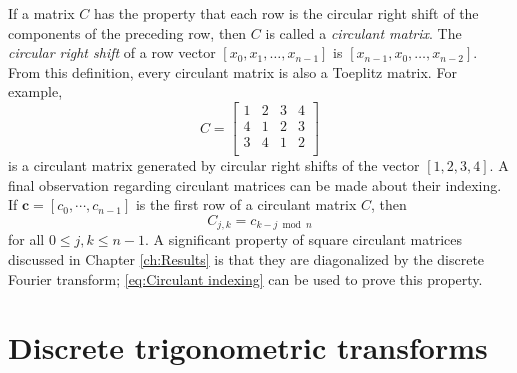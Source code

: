 If a matrix $C$ has the property that each row is the circular right shift of the components of the preceding row, then $C$ is called a \textit{circulant matrix}. The \textit{circular right shift} of a row vector $[x_0,x_1,\ldots,x_{n-1}]$ is $[x_{n-1},x_0,\ldots,x_{n-2}]$. From this definition, every circulant matrix is also a Toeplitz matrix. For example,
\[C = \begin{bmatrix}
1 & 2 & 3 & 4 \\
4 & 1 & 2 & 3 \\
3 & 4 & 1 & 2 \\
\end{bmatrix}\] 
is a circulant matrix generated by circular right shifts of the vector $[1,2,3,4]$. A final observation regarding circulant matrices can be made about their indexing. If $\mathbf{c} = [c_0,\cdots,c_{n-1}]$ is the first row of a circulant matrix $C$, then
\begin{equation}
\label{eq:Circulant indexing}
C_{j,k} = c_{k-j \bmod n}
\end{equation}
for all $0 \leq j,k \leq n-1$. A significant property of square circulant matrices discussed in Chapter \ref{ch:Results} is that they are diagonalized by the discrete Fourier transform; \eqref{eq:Circulant indexing} can be used to prove this property.

\section{Discrete trigonometric transforms} \label{sec:Discrete trig. transforms}

